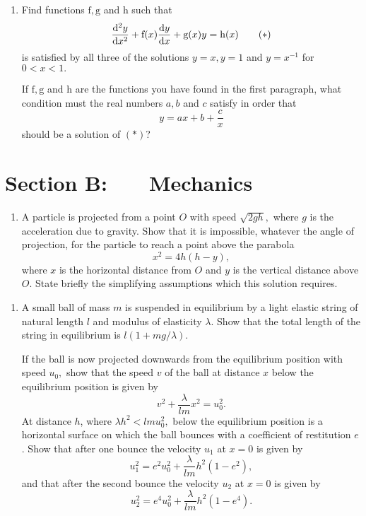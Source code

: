 \documentclass[a4, 11pt]{report}
\newlength{\qspace}
\newcounter{qnumber}
\newenvironment{question}%
 {\vspace{\qspace}
  \begin{enumerate}[\bfseries 1\quad][10]%
    \setcounter{enumi}{\value{qnumber}}%
    \item%
 }
{
  \end{enumerate}
  \filbreak
  \stepcounter{qnumber}
 }
\begin{document}
\begin{question}	
Find functions $\mathrm{f,g}$ and $\mathrm{h}$ such that 
\[
\frac{\mathrm{d}^{2}y}{\mathrm{d}x^{2}}+\mathrm{f}(x)\frac{\mathrm{d}y}{\mathrm{d}x}+\mathrm{g}(x)y=\mathrm{h}(x)\tag{\ensuremath{*}}
\]
is satisfied by all three of the solutions $y=x,y=1$ and $y=x^{-1}$
for $0<x<1.$ 


If $\mathrm{f,g}$ and $\mathrm{h}$ are the functions you have found
in the first paragraph, what condition must the real numbers $a,b$
and $c$ satisfy in order that 
\[
y=ax+b+\frac{c}{x}
\]
should be a solution of $(*)$?
\end{question}	
		

		
	
\newpage
\section*{Section B: \ \ \ Mechanics}


	
\begin{question}
A particle is projected from a point $O$ with speed $\sqrt{2gh},$
where $g$ is the acceleration due to gravity. Show that it is impossible,
whatever the angle of projection, for the particle to reach a point
above the parabola 
\[
x^{2}=4h(h-y),
\]
where $x$ is the horizontal distance from $O$ and $y$ is the vertical
distance above $O$. State briefly the simplifying assumptions which
this solution requires. 
	\end{question}
	
\begin{question}	
A small ball of mass $m$ is suspended in equilibrium by a light elastic
string of natural length $l$ and modulus of elasticity $\lambda.$
Show that the total length of the string in equilibrium is $l(1+mg/\lambda).$ 


If the ball is now projected downwards from the equilibrium position
with speed $u_{0},$ show that the speed $v$ of the ball at distance
$x$ below the equilibrium position is given by 
\[
v^{2}+\frac{\lambda}{lm}x^{2}=u_{0}^{2}.
\]
At distance $h$, where $\lambda h^{2}<lmu_{0}^{2},$ below the equilibrium
position is a horizontal surface on which the ball bounces with a
coefficient of restitution $e$. Show that after one bounce the velocity
$u_{1}$ at $x=0$ is given by 
\[
u_{1}^{2}=e^{2}u_{0}^{2}+\frac{\lambda}{lm}h^{2}(1-e^{2}),
\]
and that after the second bounce the velocity $u_{2}$ at $x=0$ is
given by 
\[
u_{2}^{2}=e^{4}u_{0}^{2}+\frac{\lambda}{lm}h^{2}(1-e^{4}).
\]
\end{question}
\end{document}
